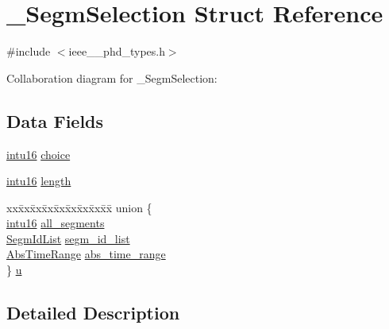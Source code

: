 \hypertarget{struct___segm_selection}{}\section{\+\_\+\+Segm\+Selection Struct Reference}
\label{struct___segm_selection}


{\ttfamily \#include $<$ieee\+\_\+\_\+phd\+\_\+types.\+h$>$}



Collaboration diagram for \+\_\+\+Segm\+Selection\+:
\subsection*{Data Fields}
\begin{DoxyCompactItemize}
\item 
\hyperlink{ieee__11073__phd__types_8h_a3561595d2aa7416532e1c9910abd076d}{intu16} \hyperlink{struct___segm_selection_a034761fd73babd925f56cbb254ce4fb2}{choice}
\item 
\hyperlink{ieee__11073__phd__types_8h_a3561595d2aa7416532e1c9910abd076d}{intu16} \hyperlink{struct___segm_selection_a3743679e4ff85e3e1b3fc2e59973fbb3}{length}
\item 
\begin{tabbing}
xx\=xx\=xx\=xx\=xx\=xx\=xx\=xx\=xx\=\kill
union \{\\
\>\hyperlink{ieee__11073__phd__types_8h_a3561595d2aa7416532e1c9910abd076d}{intu16} \hyperlink{struct___segm_selection_a8ac8e1085d99d73f52c8d865f5efcdf8}{all\_segments}\\
\>\hyperlink{ieee__11073__phd__types_8h_a33b9491b772522ce366226abcbe758bd}{SegmIdList} \hyperlink{struct___segm_selection_a449adfe911e3249f661fd9bccd99b46c}{segm\_id\_list}\\
\>\hyperlink{ieee__11073__phd__types_8h_aa6398b26e495aa039bcf5166d42e851f}{AbsTimeRange} \hyperlink{struct___segm_selection_a961d635d9456a2015f680617ee057ea7}{abs\_time\_range}\\
\} \hyperlink{struct___segm_selection_a1295494d29197288044b24e5c654882f}{u}\\

\end{tabbing}\end{DoxyCompactItemize}


\subsection{Detailed Description}


